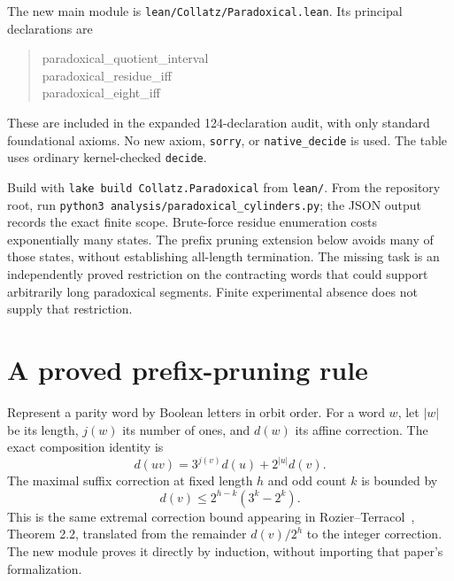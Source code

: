 \documentclass[11pt]{article}
\begin{document}
The new main module is \texttt{lean/Collatz/Paradoxical.lean}. Its principal declarations are
\begin{quote}\small\ttfamily
paradoxical\_quotient\_interval\\
paradoxical\_residue\_iff\\
paradoxical\_eight\_iff
\end{quote}
These are included in the expanded 124-declaration audit, with only standard foundational axioms. No new axiom, \texttt{sorry}, or \texttt{native\_decide} is used. The table uses ordinary kernel-checked \texttt{decide}.

Build with \texttt{lake build Collatz.Paradoxical} from \texttt{lean/}. From the repository root, run {\small\texttt{python3 analysis/paradoxical\_cylinders.py}}; the JSON output records the exact finite scope. Brute-force residue enumeration costs exponentially many states. The prefix pruning extension below avoids many of those states, without establishing all-length termination. The missing task is an independently proved restriction on the contracting words that could support arbitrarily long paradoxical segments. Finite experimental absence does not supply that restriction.

\section{A proved prefix-pruning rule}
Represent a parity word by Boolean letters in orbit order. For a word $w$, let $|w|$ be its length, $j(w)$ its number of ones, and $d(w)$ its affine correction. The exact composition identity is
\[
d(uv)=3^{j(v)}d(u)+2^{|u|}d(v).
\]
The maximal suffix correction at fixed length $h$ and odd count $k$ is bounded by
\begin{equation}\label{eq:suffix}
d(v)\le2^{h-k}(3^k-2^k).
\end{equation}
This is the same extremal correction bound appearing in Rozier--Terracol~\cite{RT}, Theorem 2.2, translated from the remainder $d(v)/2^h$ to the integer correction. The new module proves it directly by induction, without importing that paper's formalization.
\end{document}
